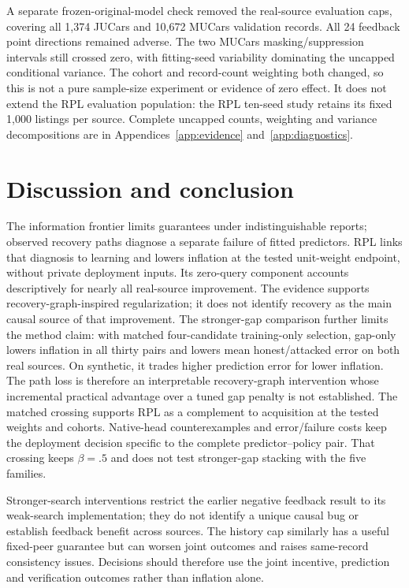 \documentclass[11pt]{article}
\begin{document}
A separate frozen-original-model check removed the real-source evaluation
caps, covering all 1,374 JUCars and 10,672 MUCars validation records. All 24
feedback point directions remained adverse. The two MUCars masking/suppression
intervals still crossed zero, with fitting-seed variability dominating the
uncapped conditional variance. The cohort and record-count weighting both
changed, so this is not a pure sample-size experiment or evidence of zero
effect. It does not extend the RPL evaluation population: the RPL ten-seed
study retains its fixed 1,000 listings per source. Complete uncapped counts,
weighting and variance decompositions are in
Appendices~\ref{app:evidence} and~\ref{app:diagnostics}.

\clearpage
\section{Discussion and conclusion}\label{sec:discussion}\label{sec:conclusion}
The information frontier limits guarantees under indistinguishable reports;
observed recovery paths diagnose a separate failure of fitted predictors.
RPL links that diagnosis to learning and lowers inflation at the tested
unit-weight endpoint, without private deployment inputs. Its zero-query
component accounts descriptively for nearly all real-source improvement.
The evidence supports recovery-graph-inspired regularization; it does not
identify recovery as the main causal source of that improvement.
The stronger-gap comparison further limits the method claim: with matched
four-candidate training-only selection, gap-only lowers inflation in all
thirty pairs and lowers mean honest/attacked error on both real sources.
On synthetic, it trades higher prediction error for lower inflation. The
path loss is therefore an interpretable recovery-graph intervention whose
incremental practical advantage over a tuned gap penalty is not established.
The matched crossing
supports RPL as a complement to acquisition at the tested weights and cohorts.
Native-head counterexamples and error/failure costs keep the deployment
decision specific to the complete predictor--policy pair. That crossing
keeps $\beta=.5$ and does not test stronger-gap stacking with the five families.

Stronger-search interventions restrict the earlier negative feedback result
to its weak-search implementation; they do not identify a unique causal bug
or establish feedback benefit across sources. The history cap similarly has
a useful fixed-peer guarantee but can worsen joint outcomes and raises
same-record consistency issues. Decisions should therefore use the joint
incentive, prediction and verification outcomes rather than inflation alone.
\end{document}
